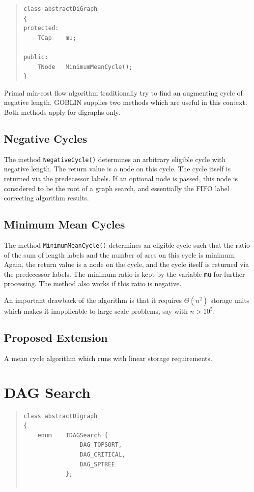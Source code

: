 \documentclass[a4paper,11pt,twoside]{book}
\begin{document}
\begin{multicols}{2}
\begin{quote}
\begin{verbatim}
class abstractDiGraph
{
protected:
    TCap    mu;

public:
    TNode   MinimumMeanCycle();
}
\end{verbatim}
\end{quote}
Primal min-cost flow algorithm traditionally try to find an augmenting cycle
of negative length. GOBLIN supplies two methods which are useful in this
context. Both methods apply for digraphs only.


\subsection{Negative Cycles}
The method \verb/NegativeCycle()/ determines an arbitrary eligible cycle with
negative length. The return value is a node on this cycle. The cycle itself is
returned via the predecessor labels. If an optional node is passed, this node is
considered to be the root of a graph search, and essentially the FIFO
label correcting algorithm results.


\subsection{Minimum Mean Cycles}
The method \verb/MinimumMeanCycle()/ determines an eligible cycle such that the
ratio of the sum of length labels and the number of arcs on this cycle is
minimum. Again, the return value is a node on the cycle, and the cycle itself
is returned via the predecessor labels. The minimum ratio is kept by the
variable \verb/mu/ for further processing. The method also works if this ratio
is negative.

An important drawback of the algorithm is that it requires $\Theta(n^2)$
storage units which makes it inapplicable to large-scale problems, say with
$n>10^5$.


\subsection{Proposed Extension}
A mean cycle algorithm which runs with linear storage requirements.



\label{slb_dag_search}
\section{DAG Search}
\methods
\begin{quote}
\begin{verbatim}
class abstractDigraph
{
    enum    TDAGSearch {
                DAG_TOPSORT,
                DAG_CRITICAL,
                DAG_SPTREE
            };


\end{verbatim}
\end{quote}
\end{multicols}
\end{document}
